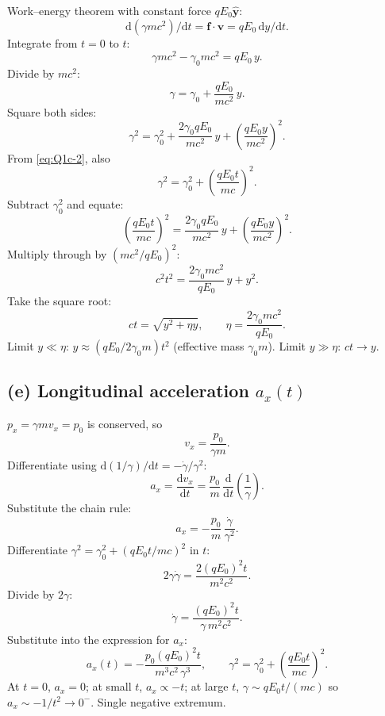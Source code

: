 \documentclass[11pt]{article}
\newcommand{\de}{\mathrm{d}}
\begin{document}
Work--energy theorem with constant force $qE_0\hat{\bm y}$:
\[ \de(\gamma mc^2)/\de t = \bm f\cdot\bm v = qE_0\,\de y/\de t. \]
Integrate from $t=0$ to $t$:
\[ \gamma mc^2 - \gamma_0 mc^2 = qE_0\,y. \]
Divide by $mc^2$:
\begin{equation}
\gamma = \gamma_0 + \frac{qE_0}{mc^2}\,y.
\label{eq:Q1d-1}
\end{equation}
Square both sides:
\[ \gamma^2 = \gamma_0^2 + \frac{2\gamma_0 qE_0}{mc^2}\,y + \left(\frac{qE_0 y}{mc^2}\right)^2. \]
From \eqref{eq:Q1c-2}, also
\[ \gamma^2 = \gamma_0^2 + \left(\frac{qE_0 t}{mc}\right)^2. \]
Subtract $\gamma_0^2$ and equate:
\[ \left(\frac{qE_0 t}{mc}\right)^2 = \frac{2\gamma_0 qE_0}{mc^2}\,y + \left(\frac{qE_0 y}{mc^2}\right)^2. \]
Multiply through by $(mc^2/qE_0)^2$:
\[ c^2 t^2 = \frac{2\gamma_0 mc^2}{qE_0}\,y + y^2. \]
Take the square root:
\begin{equation}
ct = \sqrt{y^2 + \eta y},\qquad \boxed{\eta = \frac{2\gamma_0 mc^2}{qE_0}.}
\end{equation}
Limit $y\ll\eta$: $y\approx (qE_0/2\gamma_0 m)t^2$ (effective mass $\gamma_0 m$). Limit $y\gg\eta$: $ct\to y$.

\subsection*{(e) Longitudinal acceleration $a_x(t)$}

$p_x=\gamma m v_x=p_0$ is conserved, so
\[ v_x = \frac{p_0}{\gamma m}. \]
Differentiate using $\de(1/\gamma)/\de t = -\dot\gamma/\gamma^2$:
\[ a_x = \frac{\de v_x}{\de t} = \frac{p_0}{m}\,\frac{\de}{\de t}\!\left(\frac{1}{\gamma}\right). \]
Substitute the chain rule:
\[ a_x = -\frac{p_0}{m}\,\frac{\dot\gamma}{\gamma^2}. \]
Differentiate $\gamma^2=\gamma_0^2+(qE_0 t/mc)^2$ in $t$:
\[ 2\gamma\dot\gamma = \frac{2(qE_0)^2 t}{m^2 c^2}. \]
Divide by $2\gamma$:
\[ \dot\gamma = \frac{(qE_0)^2 t}{\gamma\, m^2 c^2}. \]
Substitute into the expression for $a_x$:
\begin{equation}
\boxed{a_x(t) = -\frac{p_0 (qE_0)^2 t}{m^3 c^2\,\gamma^3},\qquad \gamma^2 = \gamma_0^2 + \left(\frac{qE_0 t}{mc}\right)^2.}
\end{equation}
At $t=0$, $a_x=0$; at small $t$, $a_x\propto -t$; at large $t$, $\gamma\sim qE_0 t/(mc)$ so $a_x\sim -1/t^2\to 0^-$. Single negative extremum.
\end{document}
